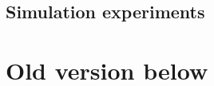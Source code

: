 \subsection{Simulation experiments}\label{sec:simulation_experiments}

\section{Old version below}







